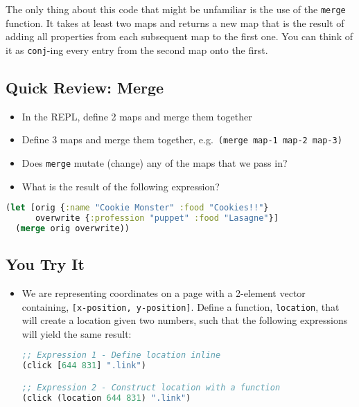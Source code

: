 \documentclass[10pt,twoside,openright]{memoir}
\begin{document}
The only thing about this code that might be unfamiliar is the use of
the \texttt{merge} function. It takes at least two maps and returns a
new map that is the result of adding all properties from each subsequent
map to the first one. You can think of it as \texttt{conj}-ing every
entry from the second map onto the first.


\subsection{Quick Review: Merge}

\begin{itemize}
\tightlist
\item
  In the REPL, define 2 maps and merge them together
\item
  Define 3 maps and merge them together,
  e.g.~\texttt{(merge\ map-1\ map-2\ map-3)}
\item
  Does \texttt{merge} mutate (change) any of the maps that we pass in?
\item
  What is the result of the following expression?
\end{itemize}

\begin{lstlisting}[language=Clojure]
(let [orig {:name "Cookie Monster" :food "Cookies!!"}
      overwrite {:profession "puppet" :food "Lasagne"}]
  (merge orig overwrite))
\end{lstlisting}


\subsection{You Try It}

\begin{itemize}
\tightlist
\item
We are representing coordinates on a page with a 2-element vector
containing, \texttt{{[}x-position,\ y-position{]}}. Define a function,
\texttt{location}, that will create a location given two numbers, such
that the following expressions will yield the same result:

\begin{lstlisting}[language=Clojure]
;; Expression 1 - Define location inline
(click [644 831] ".link")

;; Expression 2 - Construct location with a function
(click (location 644 831) ".link")
\end{lstlisting}
\end{itemize}
\end{document}

